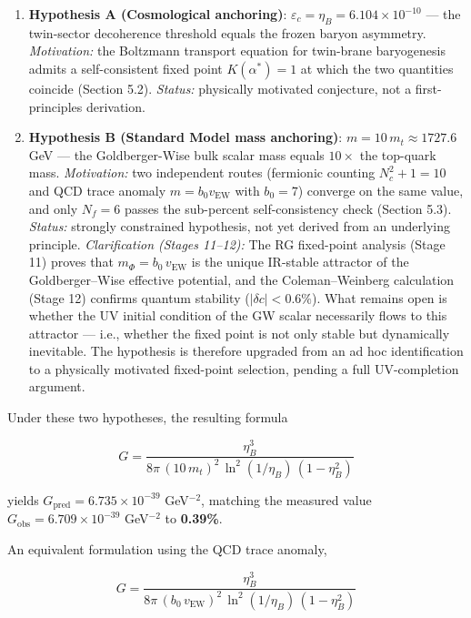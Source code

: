 \documentclass[
  11pt,
]{article}
\providecommand{\tightlist}{%
  \setlength{\itemsep}{0pt}\setlength{\parskip}{0pt}}
\begin{document}
\begin{enumerate}
\def\labelenumi{\arabic{enumi}.}
\tightlist
\item
  \textbf{Hypothesis A (Cosmological anchoring)}:
  \(\varepsilon_c = \eta_B = 6.104 \times 10^{-10}\) --- the twin-sector
  decoherence threshold equals the frozen baryon asymmetry.
  \emph{Motivation:} the Boltzmann transport equation for twin-brane
  baryogenesis admits a self-consistent fixed point \(K(\alpha^*) = 1\)
  at which the two quantities coincide (Section 5.2). \emph{Status:}
  physically motivated conjecture, not a first-principles derivation.
\item
  \textbf{Hypothesis B (Standard Model mass anchoring)}:
  \(m = 10\,m_t \approx 1727.6\) GeV --- the Goldberger-Wise bulk scalar
  mass equals \(10 \times\) the top-quark mass. \emph{Motivation:} two
  independent routes (fermionic counting \(N_c^2 + 1 = 10\) and QCD
  trace anomaly \(m = b_0 v_{\text{EW}}\) with \(b_0 = 7\)) converge on
  the same value, and only \(N_f = 6\) passes the sub-percent
  self-consistency check (Section 5.3). \emph{Status:} strongly
  constrained hypothesis, not yet derived from an underlying principle.
  \emph{Clarification (Stages 11--12):} The RG fixed-point analysis
  (Stage 11) proves that \(m_\Phi = b_0\,v_{\text{EW}}\) is the unique
  IR-stable attractor of the Goldberger--Wise effective potential, and
  the Coleman--Weinberg calculation (Stage 12) confirms quantum
  stability (\(|\delta c| < 0.6\%\)). What remains open is whether the
  UV initial condition of the GW scalar necessarily flows to this
  attractor --- i.e., whether the fixed point is not only stable but
  dynamically inevitable. The hypothesis is therefore upgraded from an
  ad hoc identification to a physically motivated fixed-point selection,
  pending a full UV-completion argument.
\end{enumerate}

Under these two hypotheses, the resulting formula

\[\boxed{G = \frac{\eta_B^3}{8\pi\,(10\,m_t)^2\,\ln^2(1/\eta_B)\,(1 - \eta_B^2)}} \tag{206}\]

yields \(G_{\text{pred}} = 6.735 \times 10^{-39}\) GeV\(^{-2}\),
matching the measured value \(G_{\text{obs}} = 6.709 \times 10^{-39}\)
GeV\(^{-2}\) to \textbf{0.39\%}.

An equivalent formulation using the QCD trace anomaly,

\[\boxed{G = \frac{\eta_B^3}{8\pi\,(b_0\,v_{\text{EW}})^2\,\ln^2(1/\eta_B)\,(1 - \eta_B^2)}} \tag{207}\]
\end{document}
